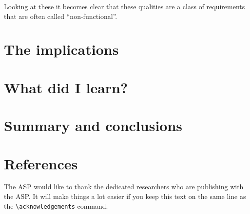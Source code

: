 \documentclass[11pt,twoside]{article}
\begin{document}
Looking at these it becomes clear that these qualities are a class of requirements that are often called ``non-functional''. 


\section{The implications}


\section{What did I learn?}


\section{Summary and conclusions}



\section{References}


\acknowledgements The ASP would like to thank the dedicated researchers who are publishing with the ASP.  It will make things a lot easier if you keep this text on the same line as the \verb"\acknowledgements" command.


\end{document}
